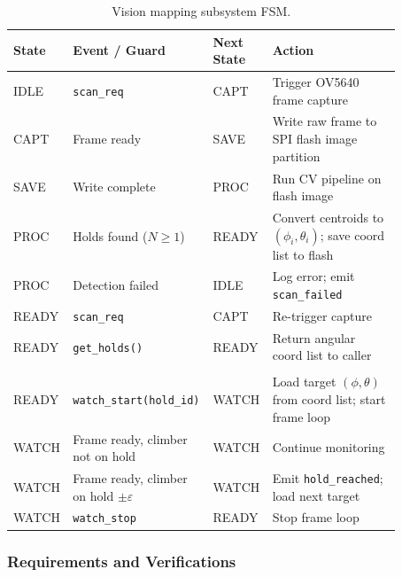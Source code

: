 \documentclass[12pt]{extarticle}
\begin{document}
\begin{table}[H]
\small\centering
\begin{tabular}{>{\raggedright}p{0.13\linewidth}
                >{\raggedright}p{0.28\linewidth}
                >{\raggedright}p{0.13\linewidth}
                >{\raggedright\arraybackslash}p{0.33\linewidth}}
\toprule
\textbf{State} & \textbf{Event / Guard} & \textbf{Next State} & \textbf{Action} \\
\midrule
IDLE  & \texttt{scan\_req}                            & CAPT  & Trigger OV5640 frame capture \\
CAPT  & Frame ready                                   & SAVE  & Write raw frame to SPI flash image partition \\
SAVE  & Write complete                                & PROC  & Run CV pipeline on flash image \\
PROC  & Holds found ($N \geq 1$)                      & READY & Convert centroids to $(\phi_i,\theta_i)$; save coord list to flash \\
PROC  & Detection failed                              & IDLE  & Log error; emit \texttt{scan\_failed} \\
READY & \texttt{scan\_req}                            & CAPT  & Re-trigger capture \\
READY & \texttt{get\_holds()}                         & READY & Return angular coord list to caller \\
\midrule
\multicolumn{4}{l}{\textit{Post-MVP: climber detection}} \\
\midrule
READY & \texttt{watch\_start(hold\_id)}               & WATCH & Load target $(\phi,\theta)$ from coord list; start frame loop \\
WATCH & Frame ready, climber not on hold              & WATCH & Continue monitoring \\
WATCH & Frame ready, climber on hold $\pm\varepsilon$ & WATCH & Emit \texttt{hold\_reached}; load next target \\
WATCH & \texttt{watch\_stop}                          & READY & Stop frame loop \\
\bottomrule
\end{tabular}
\caption{Vision mapping subsystem FSM.}
\label{tab:fsm-vision}
\end{table}

\subsubsection{Requirements and Verifications}
\end{document}
